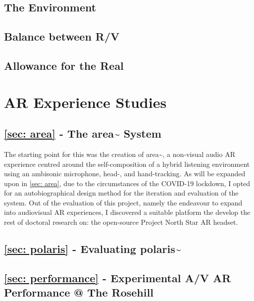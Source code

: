 \subsection{The Environment}
\subsection{Balance between R/V}
\subsection{Allowance for the Real}



\section{AR Experience Studies}
\subsection{\autoref{sec: area} -  The area\textasciitilde{} System}
The starting point for this was the creation of area\textasciitilde{}, a non-visual audio AR experience centred around the self-composition of a hybrid listening environment using an ambisonic microphone, head-, and hand-tracking. As will be expanded upon in \autoref{sec: area}, due to the circumstances of the COVID-19 lockdown, I opted for an autobiographical design method for the iteration and evaluation of the system. Out of the evaluation of this project, namely the endeavour to expand into audiovisual AR experiences, I discovered a suitable platform the develop the rest of doctoral research on: the open-source Project North Star AR headset.

\subsection{\autoref{sec: polaris} - Evaluating polaris\textasciitilde{}}
\subsection{\autoref{sec: performance} - Experimental A/V AR Performance @ The Rosehill}


